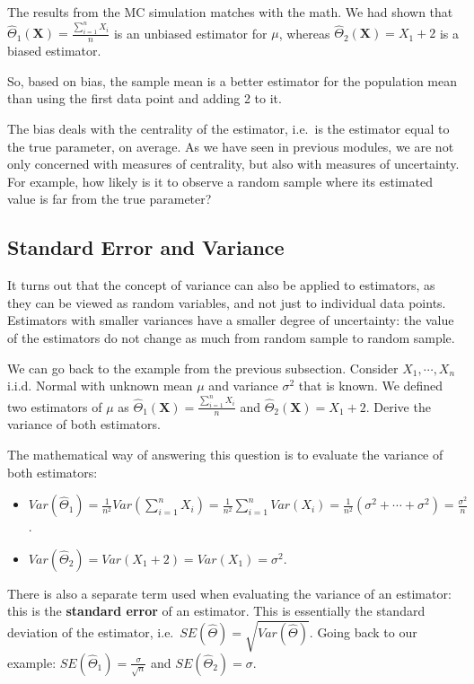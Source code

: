 \documentclass[
]{book}
\begin{document}
The results from the MC simulation matches with the math. We had shown that \(\hat{\Theta}_1(\boldsymbol{X}) = \frac{\sum_{i=1}^n X_i}{n}\) is an unbiased estimator for \(\mu\), whereas \(\hat{\Theta}_2(\boldsymbol{X}) = X_1 + 2\) is a biased estimator.

So, based on bias, the sample mean is a better estimator for the population mean than using the first data point and adding 2 to it.

The bias deals with the centrality of the estimator, i.e.~is the estimator equal to the true parameter, on average. As we have seen in previous modules, we are not only concerned with measures of centrality, but also with measures of uncertainty. For example, how likely is it to observe a random sample where its estimated value is far from the true parameter?

\hypertarget{standard-error-and-variance}{%
\subsection{Standard Error and Variance}\label{standard-error-and-variance}}

It turns out that the concept of variance can also be applied to estimators, as they can be viewed as random variables, and not just to individual data points. Estimators with smaller variances have a smaller degree of uncertainty: the value of the estimators do not change as much from random sample to random sample.

We can go back to the example from the previous subsection. Consider \(X_1, \cdots, X_n\) i.i.d. Normal with unknown mean \(\mu\) and variance \(\sigma^2\) that is known. We defined two estimators of \(\mu\) as \(\hat{\Theta}_1(\boldsymbol{X}) = \frac{\sum_{i=1}^n X_i}{n}\) and \(\hat{\Theta}_2(\boldsymbol{X}) = X_1 + 2\). Derive the variance of both estimators.

The mathematical way of answering this question is to evaluate the variance of both estimators:

\begin{itemize}
\item
  \(Var(\hat{\Theta}_1) = \frac{1}{n^2}Var(\sum_{i=1}^n X_i) = \frac{1}{n^2} \sum_{i=1}^n Var(X_i) = \frac{1}{n^2} (\sigma^2 + \cdots + \sigma^2) = \frac{\sigma^2}{n}\).
\item
  \(Var(\hat{\Theta}_2) = Var(X_1 + 2) = Var(X_1) = \sigma^2\).
\end{itemize}

There is also a separate term used when evaluating the variance of an estimator: this is the \textbf{standard error} of an estimator. This is essentially the standard deviation of the estimator, i.e.~\(SE(\hat{\Theta}) = \sqrt{Var(\hat{\Theta})}\). Going back to our example: \(SE(\hat{\Theta}_1) = \frac{\sigma}{\sqrt{n}}\) and \(SE(\hat{\Theta}_2) = \sigma\).
\end{document}
